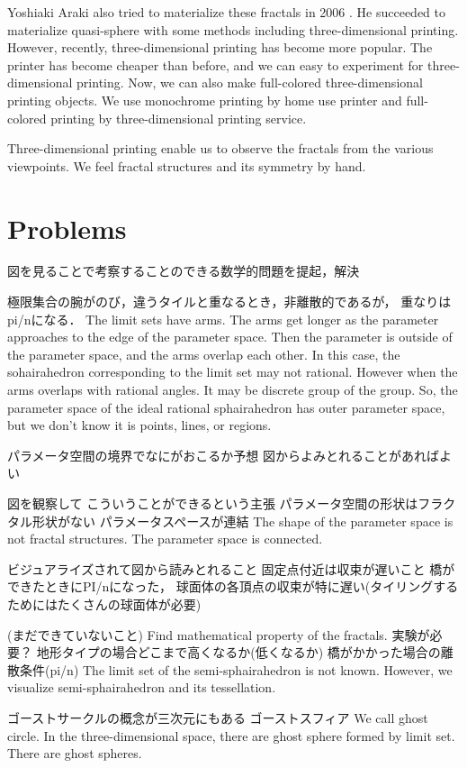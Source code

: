 \documentclass[dvipdfmx]{interact}
\theoremstyle{plain}%
\theoremstyle{definition}
\theoremstyle{remark}
\theoremstyle{problemstyle}
\begin{document}
Yoshiaki Araki also tried to materialize these fractals in 2006
\cite{araki2006materializing}.
He succeeded to materialize quasi-sphere with some methods including
three-dimensional printing.
However, recently, three-dimensional printing has become more popular.
The printer has become cheaper than before, and we can easy to
experiment for three-dimensional printing.
Now, we can also make full-colored three-dimensional printing objects.
We use monochrome printing by home use printer and full-colored
printing by three-dimensional printing service.

Three-dimensional printing enable us to observe the fractals from the
various viewpoints.
We feel fractal structures and its symmetry by hand.

\section{Problems}
図を見ることで考察することのできる数学的問題を提起，解決

極限集合の腕がのび，違うタイルと重なるとき，非離散的であるが，
重なりはpi/nになる．
The limit sets have arms. The arms get longer as the parameter approaches
to the edge of the parameter space.
Then the parameter is outside of the parameter space, and the
arms overlap each other.
In this case, the sohairahedron corresponding to the limit set may not
rational.
However when the arms overlaps with rational angles.
It may be discrete group of the group.
So, the parameter space of the ideal rational sphairahedron has outer
parameter space, but we don't know it is points, lines, or regions.

パラメータ空間の境界でなにがおこるか予想
図からよみとれることがあればよい

図を観察して こういうことができるという主張
パラメータ空間の形状はフラクタル形状がない
パラメータスペースが連結
The shape of the parameter space is not fractal structures.
The parameter space is connected.

ビジュアライズされて図から読みとれること
固定点付近は収束が遅いこと
橋ができたときにPI/nになった，
球面体の各頂点の収束が特に遅い(タイリングするためにはたくさんの球面体が必要)

(まだできていないこと)
Find mathematical property of the fractals.
実験が必要？
地形タイプの場合どこまで高くなるか(低くなるか)
橋がかかった場合の離散条件(pi/n)
The limit set of the semi-sphairahedron is not known.
However, we visualize semi-sphairahedron and its tessellation.

ゴーストサークルの概念が三次元にもある
ゴーストスフィア
We call ghost circle. In the three-dimensional space, there are ghost
sphere formed by limit set.
There are ghost spheres.
\end{document}
